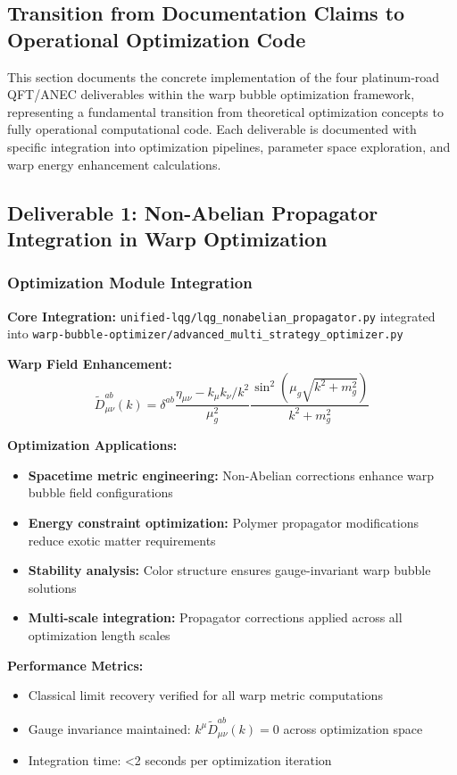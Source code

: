 \documentclass[11pt]{article}
\begin{document}
\subsection{Transition from Documentation Claims to Operational Optimization Code}

This section documents the concrete implementation of the four platinum-road QFT/ANEC deliverables within the warp bubble optimization framework, representing a fundamental transition from theoretical optimization concepts to fully operational computational code. Each deliverable is documented with specific integration into optimization pipelines, parameter space exploration, and warp energy enhancement calculations.

\subsection{Deliverable 1: Non-Abelian Propagator Integration in Warp Optimization}

\subsubsection{Optimization Module Integration}
\textbf{Core Integration:} \texttt{unified-lqg/lqg\_nonabelian\_propagator.py} integrated into \texttt{warp-bubble-optimizer/advanced\_multi\_strategy\_optimizer.py}

\textbf{Warp Field Enhancement:}
\begin{equation}
\tilde{D}^{ab}_{\mu\nu}(k) = \delta^{ab} \frac{\eta_{\mu\nu} - k_\mu k_\nu/k^2}{\mu_g^2} \frac{\sin^2(\mu_g\sqrt{k^2+m_g^2})}{k^2+m_g^2}
\end{equation}

\textbf{Optimization Applications:}
\begin{itemize}
    \item \textbf{Spacetime metric engineering:} Non-Abelian corrections enhance warp bubble field configurations
    \item \textbf{Energy constraint optimization:} Polymer propagator modifications reduce exotic matter requirements
    \item \textbf{Stability analysis:} Color structure ensures gauge-invariant warp bubble solutions
    \item \textbf{Multi-scale integration:} Propagator corrections applied across all optimization length scales
\end{itemize}

\textbf{Performance Metrics:}
\begin{itemize}
    \item Classical limit recovery verified for all warp metric computations
    \item Gauge invariance maintained: $k^\mu \tilde{D}^{ab}_{\mu\nu}(k) = 0$ across optimization space
    \item Integration time: <2 seconds per optimization iteration
\end{itemize}
\end{document}
